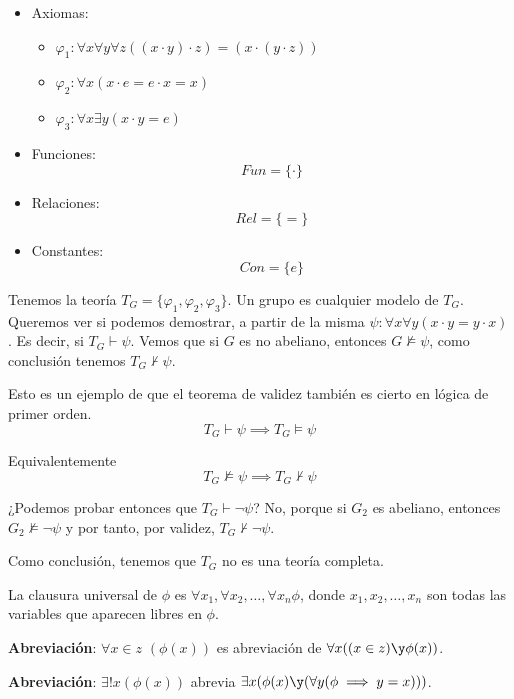 \begin{example}\mbox{}

\begin{itemize}

	\item Axiomas:
	\begin{itemize}
		\vspace{-3mm}
		\item $\varphi_1: \forall x\forall y\forall z ((x\cdot y)\cdot z) = (x\cdot(y\cdot z))$
		\item $\varphi_2: \forall x(x\cdot e = e\cdot x = x)$
		\item $\varphi_3: \forall x\exists y (x\cdot y = e)$
	\end{itemize}

	\item Funciones:
	$$Fun = \{\cdot\}$$
	
	\item Relaciones:
	$$Rel = \{=\}$$
	
	\item Constantes:
	$$Con = \{e\}$$
\end{itemize}

Tenemos la teoría $T_G = \{\varphi_1, \varphi_2, \varphi_3\}$. Un grupo es cualquier modelo de $T_G$. Queremos ver si podemos demostrar, a partir de la misma $\psi: \forall x\forall y(x\cdot y = y\cdot x)$. Es decir, si $T_G\vdash \psi$. Vemos que si $G$ es no abeliano, entonces $G\nvDash \psi$, como conclusión tenemos $T_G\nvdash \psi$.

Esto es un ejemplo de que el teorema de validez también es cierto en lógica de primer orden.
$$T_G\vdash \psi \implies T_G \vDash \psi$$

Equivalentemente
$$T_G\nvDash \psi \implies T_G \nvdash \psi$$

¿Podemos probar entonces que $T_G\vdash \neg \psi$? No, porque si $G_2$ es abeliano, entonces $G_2\nvDash \neg\psi$ y por tanto, por validez, $T_G\nvdash \neg \psi$.

Como conclusión, tenemos que $T_G$ no es una teoría completa.
\end{example}

\begin{defn}
	La clausura universal de $\phi$ es $\forall x_1, \forall x_2,\hdots, \forall x_n \phi$, donde $x_1, x_2, \hdots, x_n$ son todas las variables que aparecen libres en $\phi$.
	
	\textbf{Abreviación}: $\forall x\in z$ $(\phi(x))$ es abreviación de $\forall x ((x\in z) \y \phi (x))$.
	
	\textbf{Abreviación}: $\exists ! x(\phi (x))$ abrevia $\exists x(\phi (x) \y (\forall y (\phi \implies y = x)))$.
\end{defn}

